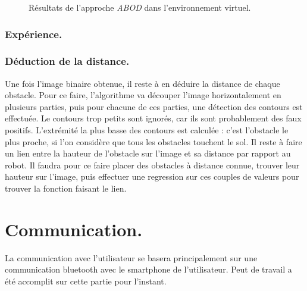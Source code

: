 \documentclass{article}
\begin{document}
\begin{figure}
\begin{center}
\begin{tabular}{cc}
        \end{tabular}
    \end{center}
    \caption{Résultats de l'approche \emph{ABOD} dans l'environnement virtuel.}
    \label{abod_simu}
\end{figure}

\subsubsection{Expérience.}

\subsubsection{Déduction de la distance.}
Une fois l'image binaire obtenue, il reste à en déduire la distance de chaque obstacle. Pour ce faire, l'algorithme va découper l'image horizontalement en plusieurs parties, puis pour chacune de ces parties, une détection des contours est effectuée. Le contours trop petits sont ignorés, car ils sont probablement des faux positifs. L'extrémité la plus basse des contours est calculée : c'est l'obstacle le plus proche, si l'on considère que tous les obstacles touchent le sol. Il reste à faire un lien entre la hauteur de l'obstacle sur l'image et sa distance par rapport au robot. Il faudra pour ce faire placer des obstacles à distance connue, trouver leur hauteur sur l'image, puis effectuer une regression sur ces couples de valeurs pour trouver la fonction faisant le lien.


\section{Communication.}
La communication avec l'utilisateur se basera principalement sur une communication bluetooth avec le smartphone de l'utilisateur. Peut de travail a été accomplit sur cette partie pour l'instant.

\newpage
\listoffigures
{}
\end{document}
